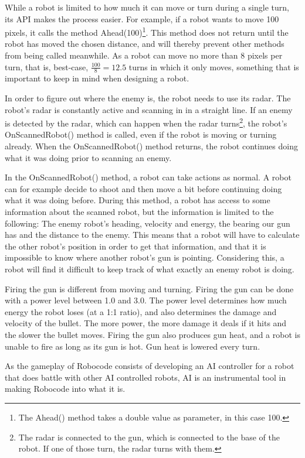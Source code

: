 While a robot is limited to how much it can move or turn during a single turn, its API\cite{robocodeAPI} makes the process easier. For example, if a robot wants to move 100 pixels, it calls the method Ahead(100)\footnote{The Ahead() method takes a double value as parameter, in this case 100.}. This method does not return until the robot has moved the chosen distance, and will thereby prevent other methods from being called meanwhile. As a robot can move no more than 8 pixels per turn, that is, best-case, $\frac{100}{8} = 12.5$ turns in which it only moves, something that is important to keep in mind when designing a robot.

In order to figure out where the enemy is, the robot needs to use its radar. The robot's radar is constantly active and scanning in in a straight line. If an enemy is detected by the radar, which can happen when the radar turns\footnote{The radar is connected to the gun, which is connected to the base of the robot. If one of those turn, the radar turns with them.}, the robot's OnScannedRobot() method is called, even if the robot is moving or turning already. When the OnScannedRobot() method returns, the robot continues doing what it was doing prior to scanning an enemy.

In the OnScannedRobot() method, a robot can take actions as normal. A robot can for example decide to shoot and then move a bit before continuing doing what it was doing before. During this method, a robot has access to some information about the scanned robot, but the information is limited to the following: The enemy robot's heading, velocity and energy, the bearing our gun has and the distance to the enemy. This means that a robot will have to calculate the other robot's position in order to get that information, and that it is impossible to know where another robot's gun is pointing. Considering this, a robot will find it difficult to keep track of what exactly an enemy robot is doing.

Firing the gun is different from moving and turning. Firing the gun can be done with a power level between 1.0 and 3.0. The power level determines how much energy the robot loses (at a 1:1 ratio), and also determines the damage and velocity of the bullet. The more power, the more damage it deals if it hits and the slower the bullet moves. Firing the gun also produces gun heat, and a robot is unable to fire as long as its gun is hot. Gun heat is lowered every turn.

As the gameplay of Robocode consists of developing an AI controller for a robot that does battle with other AI controlled robots, AI is an instrumental tool in making Robocode into what it is.


